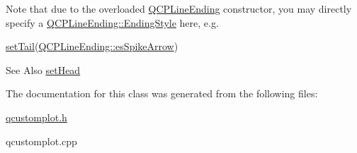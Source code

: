 Note that due to the overloaded \hyperlink{classQCPLineEnding}{Q\-C\-P\-Line\-Ending} constructor, you may directly specify a \hyperlink{classQCPLineEnding_a5ef16e6876b4b74959c7261d8d4c2cd5}{Q\-C\-P\-Line\-Ending\-::\-Ending\-Style} here, e.\-g.
\begin{DoxyCode}
\hyperlink{classQCPItemLine_ac264222c3297a7efe33df9345c811a5f}{setTail}(\hyperlink{classQCPLineEnding_a5ef16e6876b4b74959c7261d8d4c2cd5ab9964d0d03f812d1e79de15edbeb2cbf}{QCPLineEnding::esSpikeArrow}) 
\end{DoxyCode}


\begin{DoxySeeAlso}{See Also}
\hyperlink{classQCPItemLine_aebf3d687114d584e0459db6759e2c3c3}{set\-Head} 
\end{DoxySeeAlso}


The documentation for this class was generated from the following files\-:\begin{DoxyCompactItemize}
\item 
\hyperlink{qcustomplot_8h}{qcustomplot.\-h}\item 
qcustomplot.\-cpp\end{DoxyCompactItemize}
